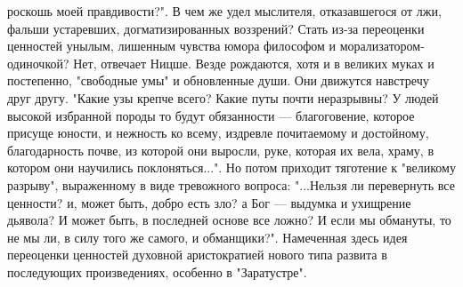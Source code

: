 \documentclass[12pt]{article}
\begin{document}
роскошь  моей  правдивости?".  В  чем  же  удел  мыслителя,  отказавшегося  от  лжи,  фальши  устаревших,
догматизированных  воззрений?  Стать  из-за  переоценки  ценностей  унылым,  лишенным  чувства  юмора
философом и морализатором-одиночкой? Нет, отвечает Ницше. Везде рождаются, хотя и в великих муках и
постепенно, "свободные умы" и обновленные души. Они движутся навстречу друг другу. "Какие узы крепче
всего?  Какие  путы  почти  неразрывны?  У  людей  высокой  избранной  породы  то  будут  обязанности  —
благоговение,  которое  присуще  юности,  и  нежность  ко  всему,  издревле  почитаемому  и  достойному, 
благодарность  почве,  из  которой  они  выросли,  руке,  которая  их  вела,  храму,  в  котором  они  научились
поклоняться...". Но потом приходит тяготение к "великому разрыву", выраженному в виде тревожного вопроса:
"...Нельзя ли перевернуть все ценности? и, может быть, добро есть зло? а Бог — выдумка и ухищрение дьявола?
И может быть, в последней основе все ложно? И если мы обмануты, то не мы ли, в силу того же самого, и
обманщики?". Намеченная здесь идея переоценки ценностей духовной аристократией нового типа развита в
последующих произведениях, особенно в "Заратустре". 

\newpage
\end{document}
